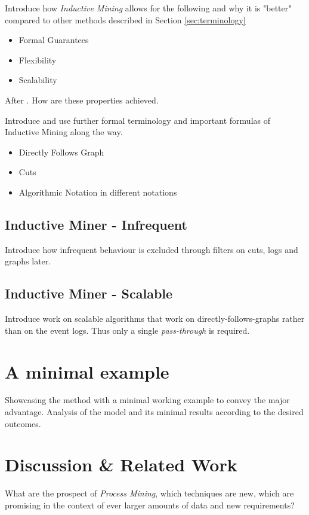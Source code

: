 \documentclass[a4paper]{IEEEtran}
\begin{document}
Introduce how \textit{Inductive Mining} allows for the following and why it is "better" compared to other methods described in Section \ref{sec:terminology}
\begin{itemize}
    \item Formal Guarantees
    \item Flexibility 
    \item Scalability
\end{itemize} 
After \cite{process_mining}. How are these properties achieved. 

Introduce and use further formal terminology and important formulas of Inductive Mining along the way. 
\begin{itemize}
    \item Directly Follows Graph
    \item Cuts 
    \item Algorithmic Notation in different notations
\end{itemize}

\subsection{Inductive Miner - Infrequent} %
\label{ssub:inductive_miner_infrequent}
Introduce how infrequent behaviour is excluded through filters on cuts, logs and graphs later. 

\subsection{Inductive Miner - Scalable} %
\label{sub:inductive_miner_scalable}
Introduce work on scalable algorithms that work on directly-follows-graphs rather than on the event logs. Thus only a single \emph{pass-through} is required.



\section{A minimal example}
\label{sec:example}
Showcasing the method with a minimal working example to convey the major advantage. Analysis of the model and its minimal results according to the desired outcomes. 


\section{Discussion \& Related Work}
What are the prospect of \textit{Process Mining}, which techniques are new, which are promising in the context of ever larger amounts of data and new requirements?



\end{document}
